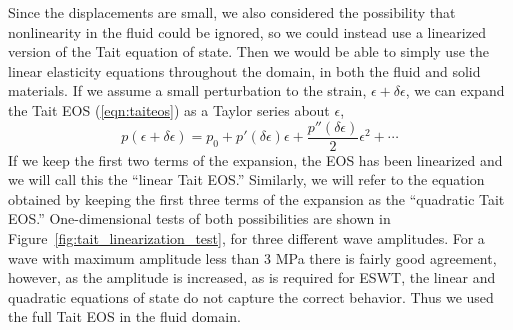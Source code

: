 \documentclass{article}
\begin{document}
Since the displacements are small, we also considered the possibility that nonlinearity in the fluid
could be ignored, so we could instead use a linearized version of the Tait 
equation of state.   Then we would be able to simply use the linear elasticity 
equations throughout the domain, in both the fluid and solid materials.  
If we assume a small perturbation to the strain, $\epsilon + \delta \epsilon$, we can expand the Tait EOS (\ref{eqn:taiteos}) as a Taylor series about $\epsilon$, 
\begin{equation}
	p(\epsilon + \delta \epsilon) = p_0 + p'(\delta \epsilon) \epsilon + \frac{p''(\delta \epsilon)}{2} \epsilon^2 +
\cdots
	\label{eqn:tait_taylor}
\end{equation}
If we keep the first two terms of the expansion, the EOS has been linearized and we will call this the 
``linear Tait EOS.''  Similarly, we will refer to the equation obtained by keeping the first three terms of the expansion as the ``quadratic Tait EOS.''
One-dimensional tests of both possibilities are shown in 
Figure~\ref{fig:tait_linearization_test}, for three different wave amplitudes.
For a wave with maximum amplitude less than 3 MPa there is fairly good agreement, however, as the amplitude is increased, as is required for ESWT, the linear and quadratic equations of state do not capture the correct behavior.  Thus we used the full Tait EOS in the fluid domain.
\end{document}
